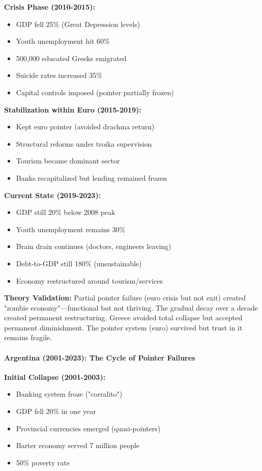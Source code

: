 \documentclass[11pt,oneside]{book}
\begin{document}
\textbf{Crisis Phase (2010-2015):}
\begin{itemize}
\item GDP fell 25\% (Great Depression levels)
\item Youth unemployment hit 60\%
\item 500,000 educated Greeks emigrated
\item Suicide rates increased 35\%
\item Capital controls imposed (pointer partially frozen)
\end{itemize}

\textbf{Stabilization within Euro (2015-2019):}
\begin{itemize}
\item Kept euro pointer (avoided drachma return)
\item Structural reforms under troika supervision
\item Tourism became dominant sector
\item Banks recapitalized but lending remained frozen
\end{itemize}

\textbf{Current State (2019-2023):}
\begin{itemize}
\item GDP still 20\% below 2008 peak
\item Youth unemployment remains 30\%
\item Brain drain continues (doctors, engineers leaving)
\item Debt-to-GDP still 180\% (unsustainable)
\item Economy restructured around tourism/services
\end{itemize}

\textbf{Theory Validation:} Partial pointer failure (euro crisis but not exit) created "zombie economy"—functional but not thriving. The gradual decay over a decade created permanent restructuring. Greece avoided total collapse but accepted permanent diminishment. The pointer system (euro) survived but trust in it remains fragile.

\paragraph{Argentina (2001-2023): The Cycle of Pointer Failures}

\textbf{Initial Collapse (2001-2003):}
\begin{itemize}
\item Banking system froze ("corralito")
\item GDP fell 20\% in one year
\item Provincial currencies emerged (quasi-pointers)
\item Barter economy served 7 million people
\item 50\% poverty rate
\end{itemize}
\end{document}
